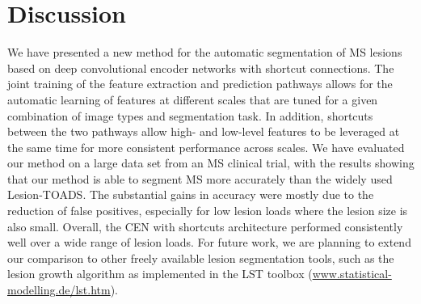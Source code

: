 \section{Discussion}





We have presented a new method for the automatic segmentation of MS lesions
based on deep convolutional encoder networks with shortcut connections.
The joint training of the feature extraction and prediction pathways allows for
the automatic learning of features at different scales that are tuned for a
given combination of image types and segmentation task. In addition, shortcuts
between the two pathways allow high- and low-level features to be leveraged at
the same time for more consistent performance across scales. We have evaluated
our method on a large data set from an MS clinical trial, with the results
showing that our method is able to segment MS
%
more accurately than
%
the widely used Lesion-TOADS.
The substantial gains in accuracy
were mostly due to the
 reduction of false positives, especially for low lesion loads where the lesion
size is also small. Overall, the CEN with shortcuts architecture performed
consistently well over a wide range of lesion loads. For future work, we are
planning to extend our comparison to other freely available lesion segmentation
tools, such as the lesion growth algorithm \cite{schmidt2012automated} as
implemented in the LST toolbox (\url{www.statistical-modelling.de/lst.htm}).

